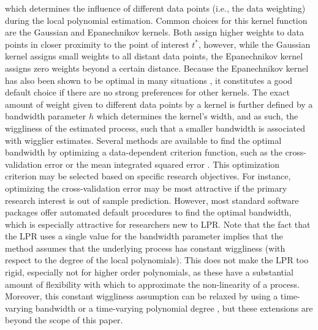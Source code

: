 \documentclass[man, floatsintext]{apa7}
\begin{document}
\noindent which determines the influence of different data points (i.e., the
data weighting) during the local polynomial estimation. Common choices for this
kernel function are the Gaussian and Epanechnikov kernels. Both assign higher
weights to data points in closer proximity to the point of interest $t^*$,
however, while the Gaussian kernel assigns small weights to all distant data
points, the Epanechnikov kernel assigns zero weights beyond a certain distance.
Because the Epanechnikov kernel has also been shown to be optimal in many
situations \parencite{fan_local_1997}, it constitutes a good default choice if
there are no strong preferences for other kernels. The exact amount of weight
given to different data points by a kernel is further defined by a bandwidth
parameter $h$ which determines the kernel's width, and as such, the wiggliness
of the estimated process, such that a smaller bandwidth is associated with
wigglier estimates. Several methods are available to find the optimal bandwidth
by optimizing a data-dependent criterion function, such as the cross-validation
error or the mean integrated squared error \parencite{kohler_review_2014,
  debruyne_model_2008}. This optimization criterion may be selected based on
specific research objectives. For instance, optimizing the cross-validation
error may be most attractive if the primary research interest is out of sample
prediction. However, most standard software packages offer automated default
procedures to find the optimal bandwidth, which is especially attractive for
researchers new to LPR\@. Note that the fact that the LPR uses a single value
for the bandwidth parameter implies that the method assumes that the underlying
process has constant wiggliness (with respect to the degree of the local
polynomials). This does not make the LPR too rigid, especially not for higher
order polynomials, as these have a substantial amount of flexibility with which
to approximate the non-linearity of a process. Moreover, this constant
wiggliness assumption can be relaxed by using a time-varying bandwidth
\parencite{fan_data-driven_1995} or a time-varying polynomial degree
\parencite{fan_adaptive_1995}, but these extensions are beyond the scope of
this
paper.
\end{document}
